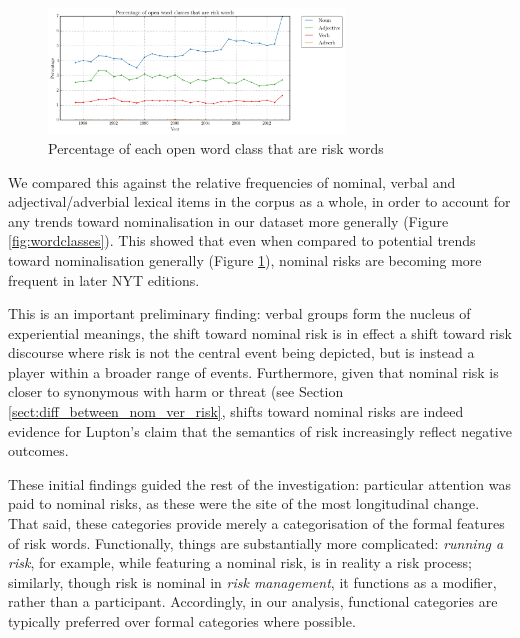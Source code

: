     \begin{figure}[htb!]
    \centering
    \includegraphics[width=0.7\textwidth]{../images/perc_open}
    \caption{Percentage of each open word class that are risk words}
    \label{fig:eachperc}
    \end{figure}




    \noindent We compared this against the relative frequencies of nominal, verbal and adjectival\slash adverbial lexical items in the corpus as a whole, in order to account for any trends toward nominalisation in our dataset more generally (Figure \ref{fig:wordclasses}). This showed that even when compared to potential trends toward nominalisation generally (Figure \ref{fig:eachperc}), nominal risks are becoming more frequent in later NYT editions. 

    This is an important preliminary finding: verbal groups form the nucleus of experiential meanings, the shift toward nominal risk is in effect a shift toward risk discourse where risk is not the central event being depicted, but is instead a player within a broader range of events. Furthermore, given that nominal risk is closer to synonymous with harm or threat (see Section \ref{sect:diff_between_nom_ver_risk}, shifts toward nominal risks are indeed evidence for Lupton's claim that the semantics of risk increasingly reflect negative outcomes.


    These initial findings guided the rest of the investigation: particular attention was paid to nominal risks, as these were the site of the most longitudinal change. That said, these categories provide merely a categorisation of the formal features of risk words. Functionally, things are substantially more complicated: \emph{running a risk}, for example, while featuring a nominal risk, is in reality a risk process; similarly, though risk is nominal in \emph{risk management}, it functions as a modifier, rather than a participant. Accordingly, in our analysis, functional categories are typically preferred over formal categories where possible.

